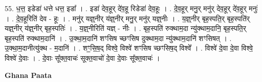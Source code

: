 \documentclass[17pt]{extarticle}
\begin{document}
55. ध॒त्त॒ इडेडा॑ धत्ते धत्त॒ इडा᳚ । . इडा॑ देव॒हूर् दे॑व॒हू रिडेडा॑ देव॒हूः । . दे॒व॒हूर् मनु॒र् मनु॑र् देव॒हूर् दे॑व॒हूर् मनुः॑ । . दे॒व॒हूरिति॑ देव - हूः । . मनु॑र् यज्ञ्॒नीर् य॑ज्ञ्॒नीर् मनु॒र् मनु॑र् यज्ञ्॒नीः । . य॒ज्ञ्॒नीर् बृह॒स्पति॒र् बृह॒स्पति॑र् यज्ञ्॒नीर् य॑ज्ञ्॒नीर् बृह॒स्पतिः॑ । . य॒ज्ञ्॒नीरिति॑ यज्ञ् - नीः । . बृह॒स्पति॑ रुक्थाम॒दा न्यु॑क्थाम॒दानि॒ बृह॒स्पति॒र् बृह॒स्पति॑ रुक्थाम॒दानि॑ । . उ॒क्था॒म॒दानि॑ शꣳसिष च्छꣳसिष दुक्थाम॒दा न्यु॑क्थाम॒दानि॑ शꣳसिषत् । . उ॒क्था॒म॒दानीत्यु॑क्थ - म॒दानि॑ । . शꣳ॒॒सि॒ष॒द् विश्वे॒ विश्वे॑ शꣳसिष च्छꣳसिष॒द् विश्वे᳚ । . विश्वे॑ दे॒वा दे॒वा विश्वे॒ विश्वे॑ दे॒वाः । . दे॒वाः सू᳚क्त॒वाचः॑ सूक्त॒वाचो॑ दे॒वा दे॒वाः सू᳚क्त॒वाचः॑ । \newline

\textbf{Ghana Paata } \newline
\end{document}
